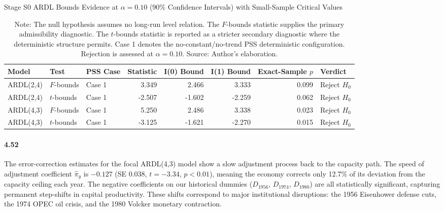 \begin{table}[H]
\centering
\caption{Stage S0 ARDL Bounds Evidence at $\alpha=0.10$ (90\% Confidence Intervals) with Small-Sample Critical Values}
\label{tab:s0_bounds_alpha10}
\footnotesize
\begin{tabular}{lllrrrrl}
\toprule
Model & Test & PSS Case & Statistic & I(0) Bound & I(1) Bound & Exact-Sample $p$ & Verdict \\
\midrule
\midrule
ARDL(2,4) & $F$-bounds & Case 1 & 3.349 & 2.466 & 3.333 & 0.099 & Reject $H_0$ \\
ARDL(2,4) & $t$-bounds & Case 1 & -2.507 & -1.602 & -2.259 & 0.062 & Reject $H_0$ \\
ARDL(4,3) & $F$-bounds & Case 1 & 5.250 & 2.486 & 3.338 & 0.023 & Reject $H_0$ \\
ARDL(4,3) & $t$-bounds & Case 1 & -3.125 & -1.621 & -2.270 & 0.015 & Reject $H_0$ \\
\bottomrule
\end{tabular}
\caption*{\footnotesize Note: The null hypothesis assumes no long-run level relation. The $F$-bounds statistic supplies the primary admissibility diagnostic. The $t$-bounds statistic is reported as a stricter secondary diagnostic where the deterministic structure permits. Case 1 denotes the no-constant/no-trend PSS deterministic configuration. Rejection is assessed at $\alpha=0.10$. Source: Author's elaboration.}
\end{table}

\paragraph{4.52}
The error-correction estimates for the focal ARDL(4,3) model show a slow adjustment process back to the capacity path. The speed of adjustment coefficient $\hat{\pi}_y$ is $-0.127$ (SE 0.038, $t = -3.34$, $p < 0.01$), meaning the economy corrects only 12.7\% of its deviation from the capacity ceiling each year. The negative coefficients on our historical dummies ($D_{1956}$, $D_{1974}$, $D_{1980}$) are all statistically significant, capturing permanent step-shifts in capital productivity. These shifts correspond to major institutional disruptions: the 1956 Eisenhower defense cuts, the 1974 OPEC oil crisis, and the 1980 Volcker monetary contraction.

